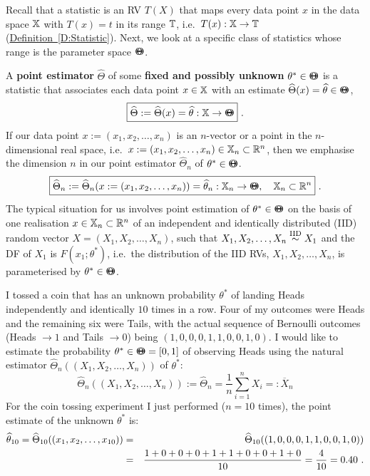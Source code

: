 Recall that a statistic is an RV $T(X)$ that maps every data point $x$ in the data space $\mathbb{X}$ with $T(x)=t$ in its range $\mathbb{T}$, i.e.~$T(x):\mathbb{X} \to \mathbb{T}$ (\hyperref[D:Statistic]{Definition~\ref*{D:Statistic}}).  Next, we look at a specific class of statistics whose range is the parameter space ${\Theta}\mspace{-11 mu}{\Theta}$.
\begin{definition}\label{D:Estimator}
A {\bf point estimator} $\widehat{\Theta}$ of some {\bf fixed and possibly unknown} $\theta^* \in {\Theta}\mspace{-11 mu}{\Theta}$ is a statistic that associates each data point $x \in \mathbb{X}$ with an estimate $\widehat{\Theta}(x)=\widehat{\theta} \in {\Theta}\mspace{-11 mu}{\Theta}$,  
\[
\boxed{
 \widehat{\Theta} := \widehat{\Theta}(x)=\widehat{\theta}: \mathbb{X} \to {\Theta}\mspace{-11 mu}{\Theta}
 } \ .
\]
If our data point $x := (x_1,x_2,\ldots,x_n)$ is an $n$-vector or a point in the $n$-dimensional real space, i.e.~$x := (x_1,x_2,\ldots,x_n) \in \mathbb{X}_n \subset \mathbb{R}^n$, then we emphasise the dimension $n$ in our point estimator $\widehat{\Theta}_n$ of $\theta^* \in {\Theta}\mspace{-11 mu}{\Theta}$.
\[
\boxed{
\widehat{\Theta}_n :=  \widehat{\Theta}_n(x:=(x_1,x_2,\ldots,x_n))=\widehat{\theta}_n : \mathbb{X}_n \to {\Theta}\mspace{-11 mu}{\Theta}, \quad \mathbb{X}_n \subset \mathbb{R}^n 
} \ .
\]
 The typical situation for us involves point estimation of $\theta^* \in {\Theta}\mspace{-11 mu}{\Theta}$ on the basis of one realisation $x \in\mathbb{X}_n \subset \mathbb{R}^n$ of an independent and identically distributed (IID) random vector $X=(X_1,X_2,\ldots,X_n)$, such that $X_1,X_2,\ldots,X_n \overset{{\rm IID}}{\sim} X_1$ and the DF of $X_1$ is $F(x_1; \theta^*)$, i.e.~the distribution of the IID RVs, $X_1, X_2,\ldots,X_n$, is parameterised by $\theta^* \in {\Theta}\mspace{-11 mu}{\Theta}$.
\end{definition}

\begin{example}\label{EX:CoinTossing}
I tossed a coin that has an unknown probability $\theta^*$ of landing Heads independently and identically $10$ times in a row.  Four of my outcomes were Heads and the remaining six were Tails, with the actual sequence of Bernoulli outcomes (Heads $\to 1$ and Tails $\to 0$) being $(1,0,0,0,1,1,0,0,1,0)$.  I would like to estimate the probability $\theta^* \in {\Theta}\mspace{-11 mu}{\Theta} = [0,1]$ of observing Heads using the natural estimator $\widehat{\Theta}_n((X_1,X_2,\ldots,X_n))$ of $\theta^*$:
\[
\widehat{\Theta}_n((X_1,X_2,\ldots,X_n)) := \widehat{\Theta}_n = \frac{1}{n} \sum_{i=1}^n X_i =: \overline{X}_n
\]
For the coin tossing experiment I just performed ($n=10$ times), the point estimate of the unknown $\theta^*$ is:
\begin{eqnarray}
\widehat{\theta}_{10} = \widehat{\Theta}_{10}((x_1,x_2,\ldots,x_{10})) 
&=&\widehat{\Theta}_{10}((1,0,0,0,1,1,0,0,1,0)) \notag \\
&=& \frac{1+0+0+0+1+1+0+0+1+0}{10}=\frac{4}{10}=0.40 \notag \ .
\end{eqnarray}
\end{example}

